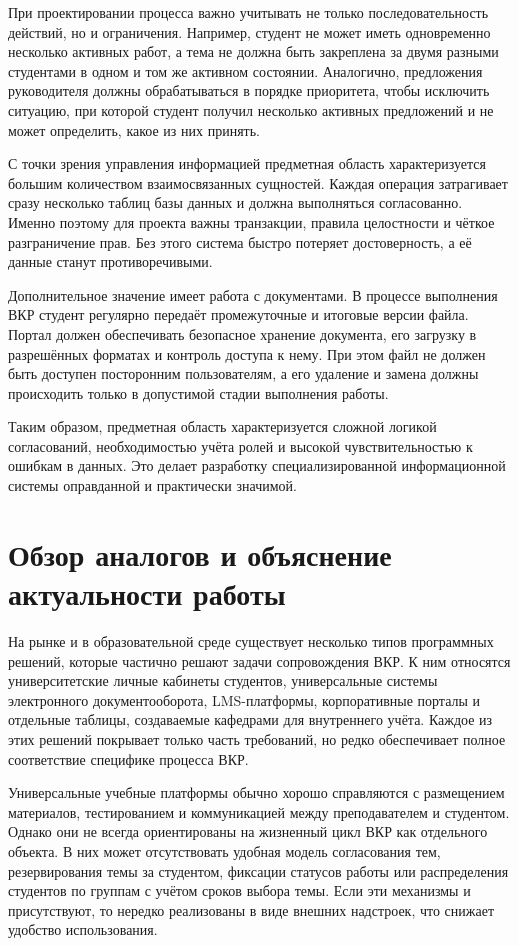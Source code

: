 \documentclass[14pt,a4paper]{extreport}
\begin{document}
При проектировании процесса важно учитывать не только последовательность
действий, но и ограничения.
Например, студент не может иметь одновременно несколько активных работ,
а тема не должна быть закреплена за двумя разными студентами в одном и том
же активном состоянии.
Аналогично, предложения руководителя должны обрабатываться в порядке
приоритета, чтобы исключить ситуацию, при которой студент получил несколько
активных предложений и не может определить, какое из них принять.

С точки зрения управления информацией предметная область характеризуется
большим количеством взаимосвязанных сущностей.
Каждая операция затрагивает сразу несколько таблиц базы данных и должна
выполняться согласованно.
Именно поэтому для проекта важны транзакции, правила целостности и чёткое
разграничение прав.
Без этого система быстро потеряет достоверность, а её данные станут
противоречивыми.

Дополнительное значение имеет работа с документами.
В процессе выполнения ВКР студент регулярно передаёт промежуточные и
итоговые версии файла.
Портал должен обеспечивать безопасное хранение документа, его загрузку в
разрешённых форматах и контроль доступа к нему.
При этом файл не должен быть доступен посторонним пользователям, а его
удаление и замена должны происходить только в допустимой стадии выполнения
работы.

Таким образом, предметная область характеризуется сложной логикой
согласований, необходимостью учёта ролей и высокой чувствительностью к
ошибкам в данных.
Это делает разработку специализированной информационной системы оправданной
и практически значимой.

\section{Обзор аналогов и объяснение актуальности работы}

На рынке и в образовательной среде существует несколько типов программных
решений, которые частично решают задачи сопровождения ВКР.
К ним относятся университетские личные кабинеты студентов, универсальные
системы электронного документооборота, LMS-платформы, корпоративные порталы
и отдельные таблицы, создаваемые кафедрами для внутреннего учёта.
Каждое из этих решений покрывает только часть требований, но редко
обеспечивает полное соответствие специфике процесса ВКР.

Универсальные учебные платформы обычно хорошо справляются с размещением
материалов, тестированием и коммуникацией между преподавателем и студентом.
Однако они не всегда ориентированы на жизненный цикл ВКР как отдельного
объекта.
В них может отсутствовать удобная модель согласования тем, резервирования
темы за студентом, фиксации статусов работы или распределения студентов по
группам с учётом сроков выбора темы.
Если эти механизмы и присутствуют, то нередко реализованы в виде внешних
надстроек, что снижает удобство использования.
\end{document}
